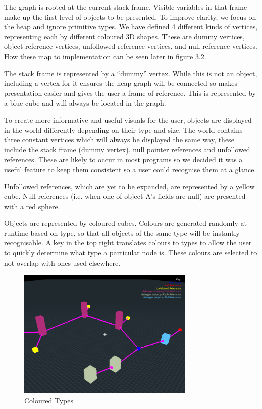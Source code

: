 \documentclass[11pt, a4paper]{report}
\begin{document}
The graph is rooted at the current stack frame. Visible variables in that frame make up the first level of objects to be presented. To improve clarity, we focus on the heap and ignore primitive types. We have defined 4 different kinds of vertices, representing each by different coloured 3D shapes. These are dummy vertices, object reference vertices, unfollowed reference vertices, and null reference vertices. How these map to implementation can be seen later in figure 3.2.

The stack frame is represented by a “dummy” vertex. While this is not an object, including a vertex for it ensures the heap graph will be connected so makes presentation easier and gives the user a frame of reference. This is represented by a blue cube and will always be located in the graph.

To create more informative and useful visuals for the user, objects are displayed in the world differently depending on their type and size. The world contains three constant vertices which will always be displayed the same way, these include the stack frame (dummy vertex), null pointer references and unfollowed references. These are likely to occur in most programs so we decided it was a useful feature to keep them consistent so a user could recognise them at a glance..

Unfollowed references, which are yet to be expanded, are represented by a yellow cube.
Null references (i.e. when one of object A’s fields are null) are presented with a red sphere.

Objects are represented by coloured cubes. Colours are generated randomly at runtime based on type, so that all objects of the same type will be instantly recognisable. A key in the top right translates colours to types to allow the user to quickly determine what type a particular node is. These colours are selected to not overlap with ones used elsewhere.

\begin{figure}[h]
        \centering
        \includegraphics[width=0.75\textwidth]{images/final/random_colours.png}
        \caption{Coloured Types}
\end{figure}
\end{document}
